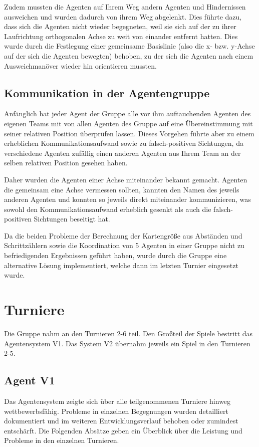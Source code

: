 \documentclass[runningheads]{llncs}
\begin{document}
	Zudem mussten die Agenten auf Ihrem Weg andern Agenten und Hindernissen ausweichen und wurden dadurch von ihrem Weg abgelenkt. Dies führte dazu, dass sich die Agenten nicht wieder begegneten,
	weil sie sich auf der zu ihrer Laufrichtung orthogonalen Achse zu weit von einander entfernt hatten. Dies wurde durch die Festlegung einer gemeinsame Basislinie (also die x- bzw. y-Achse auf der sich die Agenten bewegten) behoben, zu der sich die Agenten nach einem Ausweichmanöver wieder hin orientieren mussten.
	
	\subsection{Kommunikation in der Agentengruppe}
	Anfänglich hat jeder Agent der Gruppe alle vor ihm auftauchenden Agenten des eigenen Teams mit von allen Agenten des Gruppe auf eine Übereinstimmung mit seiner relativen Position überprüfen lassen. Dieses Vorgehen führte aber zu einem erheblichen Kommunikationsaufwand sowie zu falsch-positiven Sichtungen, da verschiedene Agenten zufällig einen anderen Agenten aus Ihrem Team an der selben relativen Position gesehen haben.
	
	Daher wurden die Agenten einer Achse miteinander bekannt gemacht. Agenten die gemeinsam eine Achse vermessen sollten, kannten den Namen des jeweils anderen Agenten und konnten so jeweils direkt miteinander kommunizieren, was sowohl den Kommunikationsaufwand erheblich gesenkt als  auch die falsch-positiven Sichtungen beseitigt hat.
	
	Da die beiden Probleme der Berechnung der Kartengröße aus Abständen und Schrittzählern sowie die  Koordination von 5 Agenten in einer Gruppe nicht zu befriedigenden Ergebnissen geführt haben, wurde durch die Gruppe eine alternative Lösung implementiert, welche dann im letzten Turnier eingesetzt wurde.
	
	\section{Turniere}\label{Turniere}
	Die Gruppe nahm an den Turnieren 2-6 teil. Den Großteil der Spiele bestritt das Agentensystem V1. Das System V2 übernahm jeweils ein Spiel in den Turnieren 2-5. 
	
	\subsection{Agent V1}
	Das Agentensystem zeigte sich über alle teilgenommenen Turniere hinweg wettbewerbsfähig. Probleme in einzelnen Begegnungen wurden detailliert dokumentiert und im weiteren Entwicklungsverlauf behoben oder zumindest entschärft. Die Folgenden Absätze geben ein Überblick über die Leistung und Probleme in den einzelnen Turnieren.
	
\end{document}
